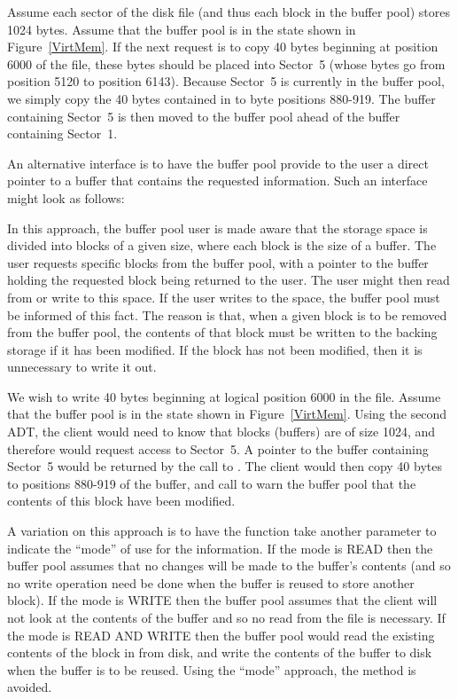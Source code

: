 \newpage

\begin{example}
Assume each sector of the disk file (and thus each block in the
buffer pool) stores 1024 bytes.
Assume that the buffer pool is in the state shown in
Figure~\ref{VirtMem}.
If the next request is to copy 40 bytes beginning at position 6000 of
the file, these bytes should be placed into Sector~5 (whose bytes go
from position 5120 to position 6143).
Because Sector~5 is currently in the buffer pool, we simply copy the 40
bytes contained in  to byte positions 880-919.
The buffer containing Sector~5 is then moved to the buffer pool ahead
of the buffer containing Sector~1.
\end{example}

An alternative interface is to have the buffer pool provide to the
user a direct pointer to a buffer that contains the requested
information.
Such an interface might look as follows:


In this approach, the buffer pool user is made aware that the
storage space is divided into blocks of a given size, where each block
is the size of a buffer.
The user requests specific blocks from the buffer pool, with a pointer
to the buffer holding the requested block being returned to the user.
The user might then read from or write to this space.
If the user writes to the space, the buffer pool must be informed of
this fact.
The reason is that, when a given block is to be removed from the
buffer pool, the contents of that block must be written to the backing
storage if it has been modified.
If the block has not been modified, then it is unnecessary to write it 
out.

\begin{example}
We wish to write 40 bytes beginning at logical position 6000 in
the file.
Assume that the buffer pool is in the state shown in
Figure~\ref{VirtMem}.
Using the second ADT, the client would need to know that blocks
(buffers) are of size 1024, and therefore would request access to
Sector~5.
A pointer to the buffer containing Sector~5 would be returned by
the call to .
The client would then copy 40 bytes to positions 880-919 of the
buffer, and call  to warn the buffer pool that the
contents of this block have been modified.
\end{example}

A variation on this approach is to have the  function
take another parameter to indicate the ``mode'' of use for the
information.
If the mode is READ then the buffer pool assumes that no changes will
be made to the buffer's contents (and so no write operation need be
done when the buffer is reused to store another block).
If the mode is WRITE then the buffer pool assumes that the client will
not look at the contents of the buffer and so no read from the file is
necessary.
If the mode is READ AND WRITE then the buffer pool would read the
existing contents of the block in from disk, and write the contents of
the buffer to disk when the buffer is to be reused.
Using the ``mode'' approach, the  method is avoided.

